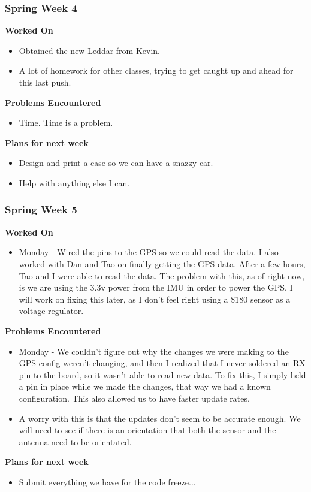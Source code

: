 \documentclass[compsoc,draftclsnofoot,onecolumn,10pt]{IEEEtran}
\begin{document}
\subsubsection*{Spring Week 4}
\textbf{Worked On}
\begin{itemize}
    \item Obtained the new Leddar from Kevin.
    \item A lot of homework for other classes, trying to get caught up and ahead for this last push.
\end{itemize}
\textbf{Problems Encountered}
\begin{itemize}
    \item Time. Time is a problem.
\end{itemize}
\textbf{Plans for next week}
\begin{itemize}
    \item Design and print a case so we can have a snazzy car.
    \item Help with anything else I can.
\end{itemize}


\subsubsection*{Spring Week 5}
\textbf{Worked On}
\begin{itemize}
    \item Monday - Wired the pins to the GPS so we could read the data. I also worked with Dan and Tao on finally getting the GPS data. After a few hours, Tao and I were able to read the data. The problem with this, as of right now, is we are using the 3.3v power from the IMU in order to power the GPS. I will work on fixing this later, as I don't feel right using a \$180 sensor as a voltage regulator.
\end{itemize}
\textbf{Problems Encountered}
\begin{itemize}
    \item Monday - We couldn't figure out why the changes we were making to the GPS config weren't changing, and then I realized that I never soldered an RX pin to the board, so it wasn't able to read new data. To fix this, I simply held a pin in place while we made the changes, that way we had a known configuration. This also allowed us to have faster update rates.
    \item A worry with this is that the updates don't seem to be accurate enough. We will need to see if there is an orientation that both the sensor and the antenna need to be orientated.
\end{itemize}
\textbf{Plans for next week}
\begin{itemize}
    \item Submit everything we have for the code freeze...
\end{itemize}
\end{document}
